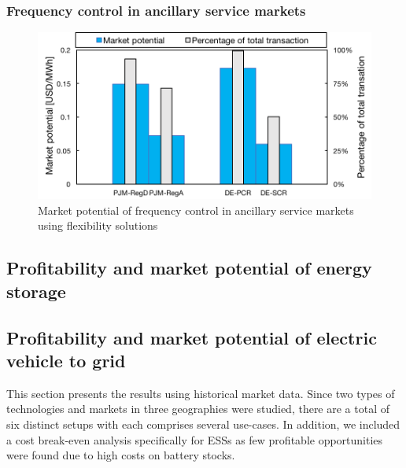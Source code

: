\subsubsection{Frequency control in ancillary service markets}

\begin{figure}[h!]
	\centering
	\includegraphics[width=0.95\linewidth]{Figures/Potential-FC}
	\caption{Market potential of frequency control in ancillary service markets using flexibility solutions}
	\label{fig:Potential-FC}
\end{figure}


\subsection[Profitability and market potential of energy storage]{Profitability and market potential of energy storage%
	}
	

\subsection[Profitability and market potential of electric vehicle to grid]{Profitability and market potential of electric vehicle to grid%
	}

This section presents the results using historical market data. Since two types of technologies and markets in three geographies were studied, there are a total of six distinct setups with each comprises several use-cases. In addition, we included a cost break-even analysis specifically for ESSs as few profitable opportunities were found due to high costs on battery stocks.

